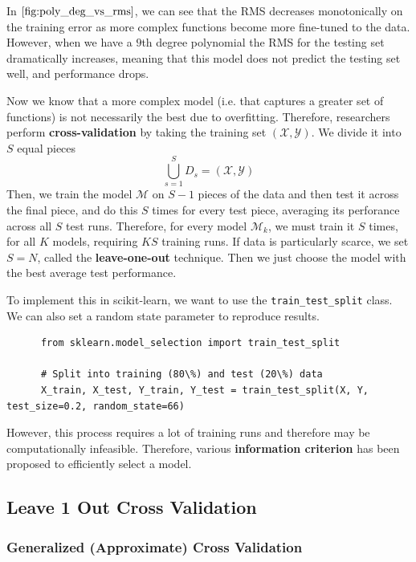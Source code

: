 \documentclass{article}
\begin{document}
    In $\ref{fig:poly_deg_vs_rms}$, we can see that the RMS decreases monotonically on the training error as more complex functions become more fine-tuned to the data. However, when we have a $9$th degree polynomial the RMS for the testing set dramatically increases, meaning that this model does not predict the testing set well, and performance drops. 

    Now we know that a more complex model (i.e. that captures a greater set of functions) is not necessarily the best due to overfitting. Therefore, researchers perform \textbf{cross-validation} by taking the training set $(\mathcal{X}, \mathcal{Y})$. We divide it into $S$ equal pieces 
    \begin{equation}
      \bigcup_{s=1}^S D_s = (\mathcal{X}, \mathcal{Y})
    \end{equation}
    Then, we train the model $\mathcal{M}$ on $S-1$ pieces of the data and then test it across the final piece, and do this $S$ times for every test piece, averaging its perforance across all $S$ test runs. Therefore, for every model $\mathcal{M}_k$, we must train it $S$ times, for all $K$ models, requiring $KS$ training runs. If data is particularly scarce, we set $S = N$, called the \textbf{leave-one-out} technique. Then we just choose the model with the best average test performance. 

    To implement this in scikit-learn, we want to use the \texttt{train\_test\_split} class. We can also set a random state parameter to reproduce results. 

    \begin{lstlisting}
      from sklearn.model_selection import train_test_split 

      # Split into training (80\%) and test (20\%) data 
      X_train, X_test, Y_train, Y_test = train_test_split(X, Y, test_size=0.2, random_state=66)
    \end{lstlisting}

    However, this process requires a lot of training runs and therefore may be computationally infeasible. Therefore, various \textbf{information criterion} has been proposed to efficiently select a model. 

  \subsection{Leave 1 Out Cross Validation} 

    \subsubsection{Generalized (Approximate) Cross Validation} 
\end{document}

